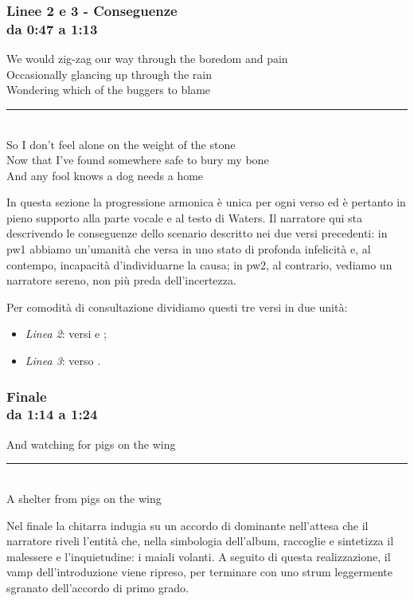 \documentclass[class=book, crop=false, oneside, 12pt]{standalone}
\begin{document}
    \subsubsection*{Linee 2 e 3 - Conseguenze\\ \small{da 0:47 a 1:13}}
    \begin{displayquote}
        We would zig-zag our way through the boredom and pain \\
        Occasionally glancing up through the rain \\
        Wondering which of the buggers to blame \\
        \vspace{0pt}
        \rule{.4\linewidth}{.5pt} \\ %
        So I don’t feel alone on the weight of the stone \\
        Now that I’ve found somewhere safe to bury my bone \\
        And any fool knows a dog needs a home 
    \end{displayquote}
    In questa sezione la progressione armonica è unica per ogni verso ed è pertanto in pieno supporto alla parte vocale e al testo di Waters. Il narratore qui sta descrivendo le conseguenze dello scenario descritto nei due versi precedenti: in \acrshort{pw1} abbiamo un'umanità che versa in uno stato di profonda infelicità e, al contempo, incapacità d'individuarne la causa; in \acrshort{pw2}, al contrario, vediamo un narratore sereno, non più preda dell'incertezza.
    
    Per comodità di consultazione dividiamo questi tre versi in due unità: 
    \begin{itemize}
        \item \emph{Linea 2}: versi  e ;
        \item \emph{Linea 3}: verso .
    \end{itemize}
        
        
    \subsubsection*{Finale\\ \small{da 1:14 a 1:24}}
    \begin{displayquote}
        And watching for pigs on the wing \\
        \vspace{0pt}
        \rule{.4\linewidth}{.5pt} \\ %
        A shelter from pigs on the wing 
    \end{displayquote}
    Nel finale la chitarra indugia su un accordo di dominante nell'attesa che il narratore riveli l'entità che, nella simbologia dell'album, raccoglie e sintetizza il malessere e l'inquietudine: i maiali volanti. A seguito di questa realizzazione, il vamp dell'introduzione viene ripreso, per terminare con uno strum leggermente sgranato dell'accordo di primo grado.
    
\end{document}
